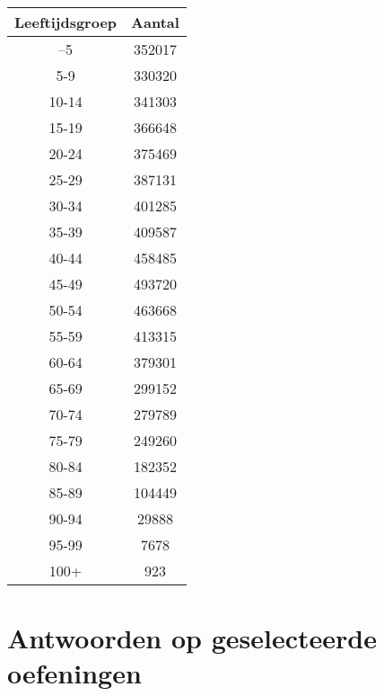 \begin{table}
  \centering
  \begin{tabular}{cc}
    \textbf{Leeftijdsgroep} & \textbf{Aantal} \\ \midrule
              –5            &     352017      \\
              5-9           &     330320      \\
             10-14          &     341303      \\
             15-19          &     366648      \\
             20-24          &     375469      \\
             25-29          &     387131      \\
             30-34          &     401285      \\
             35-39          &     409587      \\
             40-44          &     458485      \\
             45-49          &     493720      \\
             50-54          &     463668      \\
             55-59          &     413315      \\
             60-64          &     379301      \\
             65-69          &     299152      \\
             70-74          &     279789      \\
             75-79          &     249260      \\
             80-84          &     182352      \\
             85-89          &     104449      \\
             90-94          &      29888      \\
             95-99          &      7678       \\
             100+           &       923
  \end{tabular}
  \label{tab:leeftijd-vlaanderen}
  

\end{table}

\section{Antwoorden op geselecteerde oefeningen}
\label{sec:chi-kwadraat-oplossingen}

